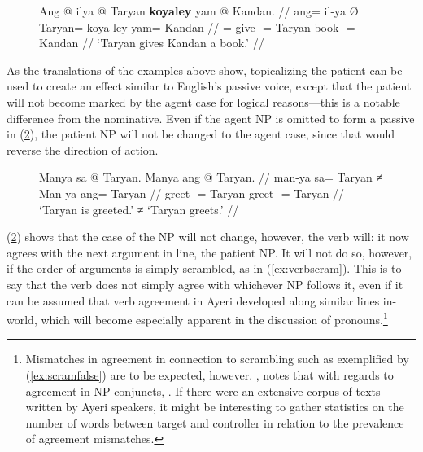 \begin{figure}
\ex\label{ex:ditrpat}
\begingl
	\gla Ang @ ilya {} @ Taryan \textbf{koyaley} yam @ Kandan. //
	\glb ang= il-ya Ø Taryan= koya-ley yam= Kandan //
	\glc \AgtT{}= give-\TsgM{} \Top{}= Taryan book-\PargI{} \Dat{}= Kandan //
	\glft `Taryan gives Kandan a book.' //
\endgl
\xe
\end{figure}

As the translations of the examples above show, topicalizing the patient can be
used to create an effect similar to English's passive voice, except that the
patient will not become marked by the agent case for logical reasons---this is
a notable difference from the nominative. Even if the agent NP is omitted to
form a passive in (\ref{ex:agtnotnom}), the patient NP will not be changed to
the agent case, since that would reverse the direction of action.

\begin{figure}
\ex\label{ex:agtnotnom}\begingl
	\gla Manya sa @ Taryan. {} Manya ang @ Taryan. //
	\glb man-ya sa= Taryan ≠ Man-ya ang= Taryan //
	\glc greet-\TsgM{} \Parg{}= Taryan {} greet-\TsgM{} \Aarg{}= Taryan //
	\glft `Taryan is greeted.' ≠ `Taryan greets.' //
\endgl\xe
\end{figure}

(\ref{ex:agtnotnom}) shows that the case of the NP will not change, however,
the verb will: it now agrees with the next argument in line, the patient NP. It
will not do so, however, if the order of arguments is simply scrambled, as in
(\ref{ex:verbscram}). This is to say that the verb does not simply agree with
whichever NP follows it, even if it can be assumed that verb agreement in Ayeri
developed along similar lines in-world, which will become especially apparent
in the discussion of pronouns.\footnote{Mismatches in agreement in connection
to scrambling such as exemplified by (\ref{ex:scramfalse}) are to be expected,
however. \citet{corbett2006}, notes that with regards to agreement in NP
conjuncts, . If there were an extensive corpus of texts written by Ayeri
speakers, it might be interesting to gather statistics on the number of words
between target and controller in relation to the prevalence of agreement
mismatches.}

